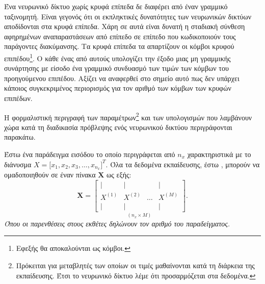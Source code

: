 Ένα νευρωνικό δίκτυο χωρίς κρυφά επίπεδα δε διαφέρει από έναν γραμμικό ταξινομητή. Είναι γεγονός ότι οι εκπληκτικές δυνατότητες των νευρωνικών δικτύων αποδίδονται στα κρυφά επίπεδα. Χάρη σε αυτά είναι δυνατή η σταδιακή σύνθεση αφηρημένων αναπαραστάσεων από επίπεδο σε επίπεδο που κωδικοποιούν τους παράγοντες διακύμανσης. Τα κρυφά επίπεδα τα απαρτίζουν οι κόμβοι κρυφού επιπέδου\footnote{Εφεξής θα αποκαλούνται ως κόμβοι.}. Ο κάθε ένας από αυτούς υπολογίζει την έξοδο μιας μη γραμμικής συνάρτησης με είσοδο ένα γραμμικό συνδυασμό των τιμών των κόμβων του προηγούμενου επιπέδου. Αξίζει να αναφερθεί στο σημείο αυτό πως δεν υπάρχει κάποιος συγκεκριμένος περιορισμός για τον αριθμό των κόμβων των κρυφών επιπέδων. \par

Η φορμαλιστική περιγραφή των παραμέτρων\footnote{Πρόκειται για μεταβλητές των οποίων οι τιμές μαθαίνονται κατά τη διάρκεια της εκπαίδευσης. Έτσι το νευρωνικό δίκτυο λέμε ότι προσαρμόζεται στα δεδομένα.} και των υπολογισμών που λαμβάνουν χώρα κατά τη διαδικασία πρόβλεψης ενός νευρωνικού δικτύου περιγράφονται παρακάτω. \par

Έστω ένα παράδειγμα εισόδου το οποίο περιγράφεται από $n_x$ χαρακτηριστικά με το διάνυσμα \(X = \big[x_1, x_2, x_3, \dots, x_{n_{x}}]^T\). Όλα τα δεδομένα εκπαίδευσης, έστω , μπορούν να ομαδοποιηθούν σε έναν πίνακα $\boldsymbol{X}$ ως εξής: 
\begin{equation}
    \boldsymbol{X} =
    \underset{(n_x \times M)}{\begin{bmatrix}
        |&|&&| \\
        X^{(1)} & X^{(2)} & \dots & X^{(M)}\\
        |&|&&|
    \end{bmatrix}}.
\end{equation}
\textit{Όπου οι παρενθέσεις στους εκθέτες δηλώνουν τον αριθμό του παραδείγματος.}\par

